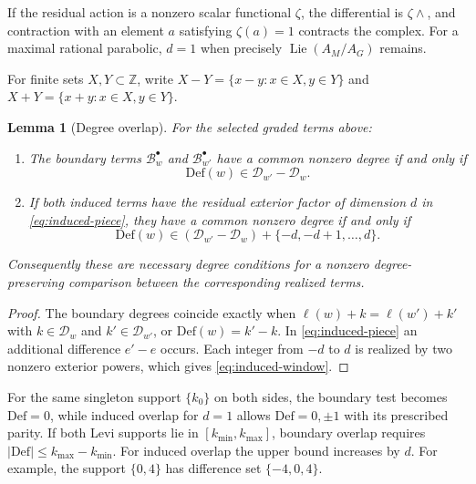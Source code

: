 \documentclass[12pt]{amsart}
\numberwithin{equation}{section}
\theoremstyle{plain}
\newtheorem{lemma}[theorem]{Lemma}
\theoremstyle{definition}
\theoremstyle{remark}
\newcommand{\Z}{\mathbb{Z}}
\newcommand{\Def}{\mathrm{Def}}
\begin{document}
If the residual action is a nonzero scalar functional $\zeta$, the differential is $\zeta\wedge{}$, and contraction with an element $a$ satisfying $\zeta(a)=1$ contracts the complex. For a maximal rational parabolic, $d=1$ when precisely $\operatorname{Lie}(A_M/A_G)$ remains.

For finite sets $X,Y\subset\Z$, write $X-Y=\{x-y:x\in X,y\in Y\}$ and $X+Y=\{x+y:x\in X,y\in Y\}$.

\begin{lemma}[Degree overlap]\label{lem:degree-overlap}
For the selected graded terms above:
\begin{enumerate}
\item The boundary terms $\mathcal B_w^\bullet$ and $\mathcal B_{w'}^\bullet$ have a common nonzero degree if and only if
\begin{equation}\label{eq:boundary-window}
 \Def(w)\in\mathcal D_{w'}-\mathcal D_w.
\end{equation}
\item If both induced terms have the residual exterior factor of dimension $d$ in \eqref{eq:induced-piece}, they have a common nonzero degree if and only if
\begin{equation}\label{eq:induced-window}
 \Def(w)\in
 (\mathcal D_{w'}-\mathcal D_w)+\{-d,-d+1,\ldots,d\}.
\end{equation}
\end{enumerate}
Consequently these are necessary degree conditions for a nonzero degree-preserving comparison between the corresponding realized terms.
\end{lemma}

\begin{proof}
The boundary degrees coincide exactly when $\ell(w)+k=\ell(w')+k'$ with $k\in\mathcal D_w$ and $k'\in\mathcal D_{w'}$, or $\Def(w)=k'-k$. In \eqref{eq:induced-piece} an additional difference $e'-e$ occurs. Each integer from $-d$ to $d$ is realized by two nonzero exterior powers, which gives \eqref{eq:induced-window}.
\end{proof}

For the same singleton support $\{k_0\}$ on both sides, the boundary test becomes $\Def=0$, while induced overlap for $d=1$ allows $\Def=0,\pm1$ with its prescribed parity. If both Levi supports lie in \([k_{\min},k_{\max}]\), boundary overlap requires
\(\lvert\Def\rvert\le k_{\max}-k_{\min}\). For induced overlap the
upper bound increases by \(d\). For example, the support \(\{0,4\}\)
has difference set \(\{-4,0,4\}\).
\end{document}
